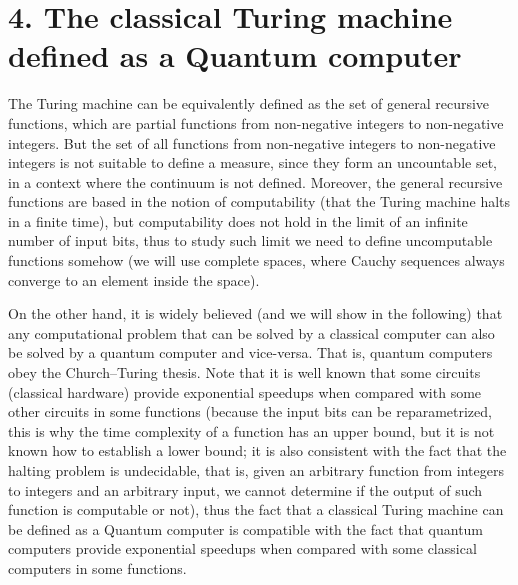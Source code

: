 \documentclass[11pt,a4paper]{report}
\begin{document}
\hypertarget{the-classical-turing-machine-defined-as-a-quantum-computer}{%
\section{4. The classical Turing machine defined as a Quantum
computer}\label{the-classical-turing-machine-defined-as-a-quantum-computer}}

The Turing machine can be equivalently defined as the set of general
recursive functions, which are partial functions from non-negative
integers to non-negative
integers\cite{sep-recursive-functions}.
But the set of all functions from non-negative integers to non-negative
integers is not suitable to define a measure, since they form an
uncountable set, in a context where the continuum is not defined.
Moreover, the general recursive functions are based in the notion of
computability (that the Turing machine halts in a finite time), but
computability does not hold in the limit of an infinite number of input
bits, thus to study such limit we need to define uncomputable functions
somehow (we will use complete spaces, where Cauchy sequences always
converge to an element inside the space).

On the other hand, it is widely believed (and we will show in the
following) that any computational problem that can be solved by a
classical computer can also be solved by a quantum computer and
vice-versa. That is, quantum computers obey the Church--Turing thesis.
Note that it is well known that some circuits (classical hardware)
provide exponential speedups when compared with some other circuits in
some functions (because the input bits can be reparametrized, this is
why the time complexity of a function has an upper bound, but it is not
known how to establish a lower bound; it is also consistent with the
fact that the halting problem is undecidable, that is, given an
arbitrary function from integers to integers and an arbitrary input, we
cannot determine if the output of such function is computable or not),
thus the fact that a classical Turing machine can be defined as a
Quantum computer is compatible with the fact that quantum computers
provide exponential speedups when compared with some classical computers
in some functions.
\end{document}
